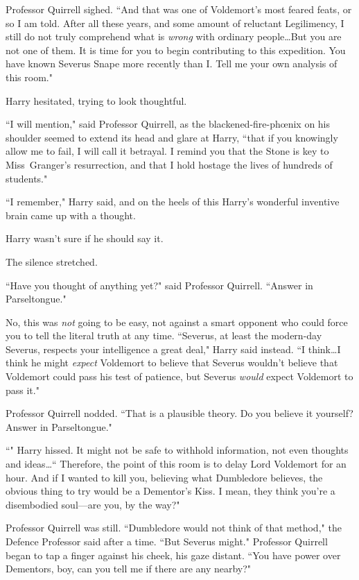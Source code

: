 Professor Quirrell sighed. ``And that was one of Voldemort's most feared feats, or so I am told. After all these years, and some amount of reluctant Legilimency, I still do not truly comprehend what is \emph{wrong} with ordinary people…But you are not one of them. It is time for you to begin contributing to this expedition. You have known Severus Snape more recently than I\@. Tell me your own analysis of this room."

Harry hesitated, trying to look thoughtful.

``I will mention," said Professor Quirrell, as the blackened-fire-phœnix on his shoulder seemed to extend its head and glare at Harry, ``that if you knowingly allow me to fail, I will call it betrayal. I remind you that the Stone is key to Miss~Granger's resurrection, and that I hold hostage the lives of hundreds of students."

``I remember," Harry said, and on the heels of this Harry's wonderful inventive brain came up with a thought.

Harry wasn't sure if he should say it.

The silence stretched.

``Have you thought of anything yet?" said Professor Quirrell. ``Answer in Parseltongue."

No, this was \emph{not} going to be easy, not against a smart opponent who could force you to tell the literal truth at any time. ``Severus, at least the modern-day Severus, respects your intelligence a great deal," Harry said instead. ``I think…I think he might \emph{expect} Voldemort to believe that Severus wouldn't believe that Voldemort could pass his test of patience, but Severus \emph{would} expect Voldemort to pass it."

Professor Quirrell nodded. ``That is a plausible theory. Do you believe it yourself? Answer in Parseltongue."

``" Harry hissed. It might not be safe to withhold information, not even thoughts and ideas…`` Therefore, the point of this room is to delay Lord Voldemort for an hour. And if I wanted to kill you, believing what Dumbledore believes, the obvious thing to try would be a Dementor's Kiss. I mean, they think you're a disembodied soul—are you, by the way?"

Professor Quirrell was still. ``Dumbledore would not think of that method," the Defence Professor said after a time. ``But Severus might." Professor Quirrell began to tap a finger against his cheek, his gaze distant. ``You have power over Dementors, boy, can you tell me if there are any nearby?"

